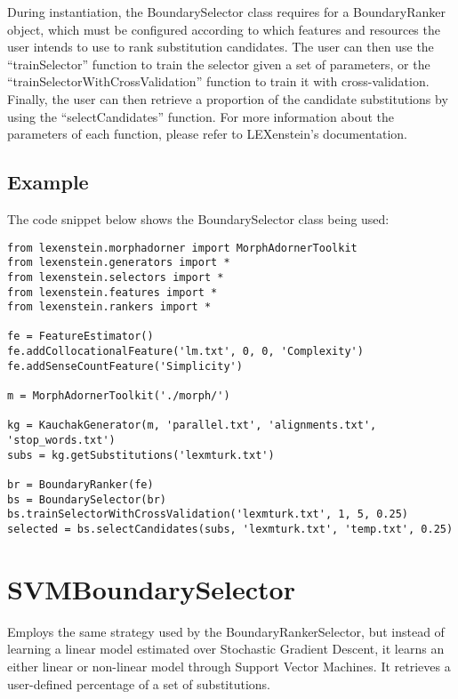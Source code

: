 During instantiation, the BoundarySelector class requires for a BoundaryRanker object, which must be configured according to which features and resources the user intends to use to rank substitution candidates. The user can then use the ``trainSelector'' function to train the selector given a set of parameters, or the ``trainSelectorWithCrossValidation'' function to train it with cross-validation. Finally, the user can then retrieve a proportion of the candidate substitutions by using the ``selectCandidates'' function. For more information about the parameters of each function, please refer to LEXenstein's documentation.

\subsection{Example}

The code snippet below shows the BoundarySelector class being used:

\begin{lstlisting}
from lexenstein.morphadorner import MorphAdornerToolkit
from lexenstein.generators import *
from lexenstein.selectors import *
from lexenstein.features import *
from lexenstein.rankers import *

fe = FeatureEstimator()
fe.addCollocationalFeature('lm.txt', 0, 0, 'Complexity')
fe.addSenseCountFeature('Simplicity')

m = MorphAdornerToolkit('./morph/')

kg = KauchakGenerator(m, 'parallel.txt', 'alignments.txt', 'stop_words.txt')
subs = kg.getSubstitutions('lexmturk.txt')

br = BoundaryRanker(fe)
bs = BoundarySelector(br)
bs.trainSelectorWithCrossValidation('lexmturk.txt', 1, 5, 0.25)
selected = bs.selectCandidates(subs, 'lexmturk.txt', 'temp.txt', 0.25)
\end{lstlisting}










\section{SVMBoundarySelector}

Employs the same strategy used by the BoundaryRankerSelector, but instead of learning a linear model estimated over Stochastic Gradient Descent, it learns an either linear or non-linear model through Support Vector Machines. It retrieves a user-defined percentage of a set of substitutions.

